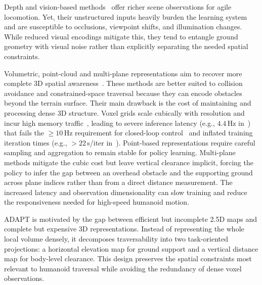Depth and vision-based methods~\cite{zhuang2024humanoidRobot,Li_2024_MOVE,zhuang2024humanoid,Yu_2025_START,Castillo_2025_LearningTerrainAwareBipedalLocomotion,Sun_2025_DPL,Wang_2025_LocoMamba,zhu2026hiking} offer richer scene observations for agile locomotion. Yet, their unstructured inputs heavily burden the learning system and are susceptible to occlusions, viewpoint shifts, and illumination changes. While reduced visual encodings mitigate this, they tend to entangle ground geometry with visual noise rather than explicitly separating the needed spatial constraints.


Volumetric, point-cloud and multi-plane representations aim to recover more complete 3D spatial awareness~\cite{Multi-Layer_ElevationMap_2025,Ben_2025_Gallant,Niijima_2025_Real-timeMulti-PlaneSegmentation,Wang_2025_Omni-Perception,Xue_2026_Collision-FreeHumanoidTraversal}. These methods are better suited to collision avoidance and constrained-space traversal because they can encode obstacles beyond the terrain surface. Their main drawback is the cost of maintaining and processing dense 3D structure. Voxel grids scale cubically with resolution and incur high memory traffic~\cite{2020arXiv200716100T}, leading to severe inference latency (e.g., $4.4$\,Hz in~\cite{2018arXiv181205784L}) that fails the $\ge 10$\,Hz requirement for closed-loop control~\cite{2022arXiv220108117M} and inflated training iteration times (e.g., $>22$\,s/iter in~\cite{Ben_2025_Gallant}). Point-based representations require careful sampling and aggregation to remain stable for policy learning. Multi-plane methods mitigate the cubic cost but leave vertical clearance implicit, forcing the policy to infer the gap between an overhead obstacle and the supporting ground across plane indices rather than from a direct distance measurement. The increased latency and observation dimensionality can slow training and reduce the responsiveness needed for high-speed humanoid motion.

ADAPT is motivated by the gap between efficient but incomplete 2.5D maps and complete but expensive 3D representations. Instead of representing the whole local volume densely, it decomposes traversability into two task-oriented projections: a horizontal elevation map for ground support and a vertical distance map for body-level clearance. This design preserves the spatial constraints most relevant to humanoid traversal while avoiding the redundancy of dense voxel observations.

